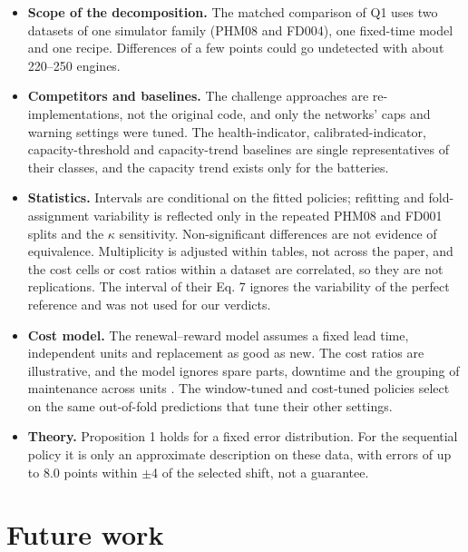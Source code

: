 \documentclass[a4paper,fleqn,doubleblind]{cas-dc}
\begin{document}
\begin{itemize}[leftmargin=1.2em,itemsep=2pt]
\item \textbf{Scope of the decomposition.} The matched comparison of Q1 uses two datasets of one simulator family (PHM08 and FD004), one fixed-time model and one recipe. Differences of a few points could go undetected with about 220--250 engines.
\item \textbf{Competitors and baselines.} The challenge approaches are re-implementations, not the original code, and only the networks' caps and warning settings were tuned. The health-indicator, calibrated-indicator, capacity-threshold and capacity-trend baselines are single representatives of their classes, and the capacity trend exists only for the batteries.
\item \textbf{Statistics.} Intervals are conditional on the fitted policies; refitting and fold-assignment variability is reflected only in the repeated PHM08 and FD001 splits and the $\kappa$ sensitivity. Non-significant differences are not evidence of equivalence. Multiplicity is adjusted within tables, not across the paper, and the cost cells or cost ratios within a dataset are correlated, so they are not replications. The interval of their Eq. 7 ignores the variability of the perfect reference and was not used for our verdicts.
\item \textbf{Cost model.} The renewal--reward model assumes a fixed lead time, independent units and replacement as good as new. The cost ratios are illustrative, and the model ignores spare parts, downtime and the grouping of maintenance across units \cite{depater2022,mitici2023}. The window-tuned and cost-tuned policies select on the same out-of-fold predictions that tune their other settings.
\item \textbf{Theory.} Proposition 1 holds for a fixed error distribution. For the sequential policy it is only an approximate description on these data, with errors of up to 8.0 points within $\pm$4 of the selected shift, not a guarantee.
\end{itemize}

\section{Future work}\label{sec:9}
\end{document}
